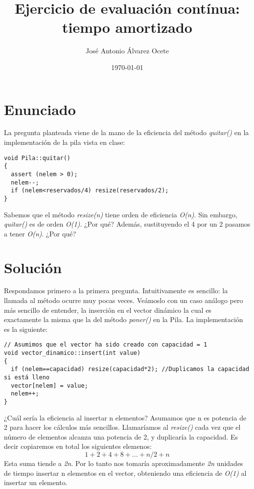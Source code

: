 \documentclass[11pt,a4paper]{article}
\title{Ejercicio de evaluación contínua: tiempo amortizado}
\author{José Antonio Álvarez Ocete}
\date{\today}
\begin{document}
\maketitle

\section{Enunciado}

La pregunta planteada viene de la mano de la eficiencia del método \emph{quitar()} en la implementación de la pila vista en clase:

\begin{lstlisting}
void Pila::quitar() 
{
  assert (nelem > 0);
  nelem--;
  if (nelem<reservados/4) resize(reservados/2);	
}
\end{lstlisting}

Sabemos que el método \emph{resize(n)} tiene orden de eficiencia \emph{O(n)}. Sin embargo, \emph{quitar()} es de orden \emph{O(1)}. ¿Por qué? Además, sustituyendo el 4 por un 2 pasamos a tener \emph{O(n)}. ¿Por qué?

\section{Solución}

Respondamos primero a la primera pregunta. Intuitivamente es sencillo: la llamada al método ocurre muy pocas veces. Veámoslo con un caso análogo pero más sencillo de entender, la inserción en el vector dinámico la cual es exactamente la misma que la del método \emph{poner()} en la Pila. La implementación es la siguiente:

\begin{lstlisting}
// Asumimos que el vector ha sido creado con capacidad = 1
void vector_dinamico::insert(int value) 
{
  if (nelem==capacidad) resize(capacidad*2); //Duplicamos la capacidad si está lleno
  vector[nelem] = value;
  nelem++;
}
\end{lstlisting}

¿Cuál sería la eficiencia al insertar n elementos? Asumamos que n es potencia de 2 para hacer los cálculos más sencillos. Llamaríamos al \emph{resize()} cada vez que el número de elementos alcanza una potencia de 2, y  duplicaría la capacidad. Es decir copiaremos en total los siguientes elemenos:
$$ 1 + 2 + 4 + 8 + ... + n/2 + n$$
Esta suma tiende a \emph{2n}. Por lo tanto nos tomaría aproximadamente \emph{2n} unidades de tiempo insertar n elementos en el vector, obteniendo una eficiencia de \emph{O(1)} al insertar un elemento. \\
\end{document}
